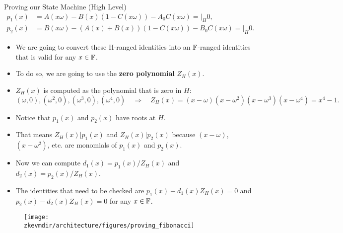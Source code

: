 \begin{frame}[allowframebreaks]{Proving our State Machine (High Level)}
\begin{align*}
p_1(x)&= A(x\omega) - B(x)(1 - C(x\omega)) - A_0C(x\omega) = \bigg\lvert_H 0,\\
p_2(x) &= B(x\omega) - (A(x) + B(x))(1 - C(x\omega)) - B_0 C(x\omega) = \bigg\lvert_H 0.
\end{align*}

\begin{itemize}
\item We are going to convert these H-ranged identities into an $\mathbb{F}$-ranged identities that 
is valid for any $x \in \mathbb{F}$.
\item To do so, we are going to use the \textbf{zero polynomial} $Z_H(x)$.
\item $Z_H(x)$ is computed as the polynomial that is zero in $H$:
\[
(\omega,0), (\omega^2,0), (\omega^3,0), (\omega^4,0) \quad \Longrightarrow \quad Z_H(x) = (x-\omega)(x-\omega^2)(x-\omega^3)(x-\omega^4) = x^4-1.
\]

\item Notice that $p_1(x)$ and $p_2(x)$ have roots at $H$.
\item That means $Z_H(x) | p_1(x)$ and $Z_H(x) | p_2(x)$ 
because $(x-\omega)$, $(x-\omega^2)$, etc. are monomials of $p_1(x)$ and  $p_2(x)$.
\item Now we can compute $d_1(x) = p_1(x) / Z_H(x)$ and $d_2(x) = p_2(x) / Z_H(x)$.
\item The identities that need to be checked are $p_1(x) - d_1(x)Z_H(x) = 0$ and $p_2(x) - d_2(x)Z_H(x) = 0$ 
for any $x \in \mathbb{F}$.
\end{itemize}

\begin{figure}
\texttt{[image: \\zkevmdir/architecture/figures/proving\_fibonacci]}
\end{figure}
\end{frame}
